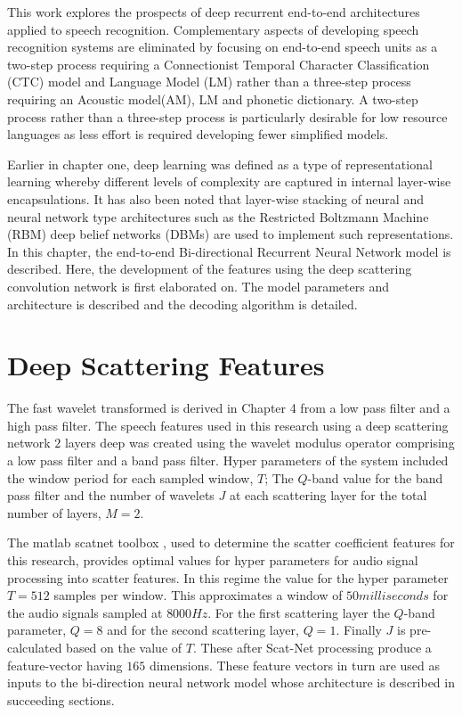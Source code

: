 This work explores the prospects of deep recurrent end-to-end architectures applied to speech recognition. Complementary aspects of developing speech recognition systems are eliminated by focusing on end-to-end speech units as a two-step process requiring a Connectionist Temporal Character Classification (CTC)\cite{graves2006connectionist} model and Language Model (LM) rather than a three-step process requiring an Acoustic model(AM), LM and phonetic dictionary. A two-step process rather than a three-step process is particularly desirable for low resource languages as less effort is required developing fewer simplified models.

Earlier in chapter one, deep learning was defined as a type of representational learning whereby different levels of complexity are captured in internal layer-wise encapsulations. It has also been noted that layer-wise stacking of neural and neural network type architectures such as the Restricted Boltzmann Machine (RBM) deep belief networks (DBMs) are used to implement such representations. In this chapter, the end-to-end Bi-directional Recurrent Neural Network model is described. Here, the development of the features using the deep scattering convolution network is first elaborated on. The model parameters and architecture is described and the decoding algorithm is detailed.

\section{Deep Scattering Features}
The fast wavelet transformed is derived in Chapter 4 from a low pass filter and a high pass filter.  The speech features used in this research using a deep scattering network $2$ layers deep was created using the wavelet modulus operator comprising a low pass filter and a band pass filter.   Hyper parameters of the system included the window period for each sampled window, $T$;  The $Q$-band value for the band pass filter and the number of wavelets $J$ at each scattering layer for the total number of layers, $M=2$.

The matlab scatnet toolbox \citep{anden2014scatnet}, used to determine the scatter coefficient features for this research, provides optimal values for hyper parameters for audio signal processing into scatter features.  In this regime the value for the hyper parameter $T=512$ samples per window. This approximates a window of $50 milliseconds$ for the audio signals sampled at $8000 Hz$.  For the first scattering layer the $Q$-band parameter, $Q=8$ and for the second scattering layer,  $Q=1$.  Finally $J$ is pre-calculated based on the value of $T$.  These after Scat-Net processing produce a feature-vector having $165$  dimensions.  These feature vectors in turn are used as inputs to the bi-direction neural network model whose architecture is described in  succeeding sections.

